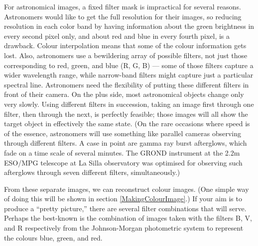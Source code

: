 \documentclass[twocolumn,apj]{openjournal}
\begin{document}
For astronomical images, a fixed filter mask is impractical for several reasons. Astronomers would like to get the full resolution for their images, so reducing resolution in each color band by having information about the green brightness in every second pixel only, and about red and blue in every fourth pixel, is a drawback. Colour interpolation means that some of the colour information gets lost.  Also, astronomers use a bewildering array of possible filters, not just those corresponding to red, green, and blue (R, G, B) --- some of those filters capture a wider wavelength range, while narrow-band filters might capture just a particular spectral line. Astronomers need the flexibility of putting these different filters in front of their camera. On the plus side, most astronomical objects change only very slowly. Using different filters in succession, taking an image first through one filter, then through the next, is perfectly feasible; those images will all show the target object in effectively the same state. (On the rare occasions where speed is of the essence, astronomers will use something like parallel cameras observing through different filters. A case in point are gamma ray burst afterglows, which fade on a time scale of several minutes. The GROND instrument at the 2.2m ESO/MPG telescope at La Silla observatory was optimised for observing such afterglows through seven different filters, simultaneously.)

From these separate images, we can reconstruct colour images. (One simple way of doing this will be shown in section \ref{MakingColourImage}.) If your aim is to produce a ``pretty picture,'' there are several filter combinations that will serve. Perhaps the best-known is the combination of images taken with the filters B, V, and R respectively from the Johnson-Morgan photometric system to represent the colours blue, green, and red. 
\end{document}
